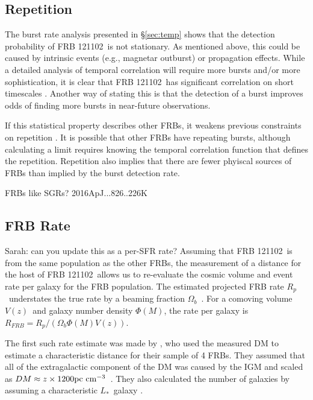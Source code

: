 \documentclass[twocolumn]{aastex61}
\newcommand{\frb}{FRB 121102}
\begin{document}
\subsection{Repetition}
The burst rate analysis presented in \S \ref{sec:temp} shows that the detection probability of \frb\ is not stationary. As mentioned above, this could be caused by intrinsic events (e.g., magnetar outburst) or propagation effects. While a detailed analysis of temporal correlation will require more bursts and/or more sophistication, it is clear that \frb\ has significant correlation on short timescales \citep[sometimes called a ``red spectrum'';][]{2016MNRAS.458L..89C}. Another way of stating this is that the detection of a burst improves odds of finding more bursts in near-future observations. 

If this statistical property describes other FRBs, it weakens previous constraints on repetition \citep{2015MNRAS.454..457P,2015ApJ...807...16L}. It is possible that other FRBs have repeating bursts, although calculating a limit requires knowing the temporal correlation function that defines the repetition.  Repetition also implies that there are fewer phyiscal sources of FRBs than implied by the burst detection rate.

FRBs like SGRs? 2016ApJ...826..226K

\subsection{FRB Rate}
{\color{red} Sarah: can you update this as a per-SFR rate?}
Assuming that \frb\ is from the same population as the other FRBs, the measurement of a distance for the host of \frb\ allows us to re-evaluate the cosmic volume and event rate per galaxy for the FRB population. The estimated projected FRB rate $R_p$\ understates the true rate by a beaming fraction $\Omega_b$\ \citep[$\sim$10\%;][]{1998MNRAS.298..625T}. For a comoving volume $V(z)$\ and galaxy number density $\Phi(M)$, the rate per galaxy is $R_{FRB} = R_p /(\Omega_b \Phi(M)V (z))$. 

The first such rate estimate was made by \citet{2013Sci...341...53T}, who used the measured DM to estimate a characteristic distance for their sample of 4 FRBs. They assumed that all of the extragalactic component of the DM was caused by the IGM and scaled as $DM\approx z\times1200 \rm{pc}\ \rm{cm}^{-3}$\ \citep{2003ApJ...598L..79I,2004MNRAS.348..999I}. They also calculated the number of galaxies by assuming a characteristic $L_*$\ galaxy \citep[corresponding to stellar mass $M_* \approx 1011 M$;][]{2012MNRAS.421..621B}.
\end{document}
